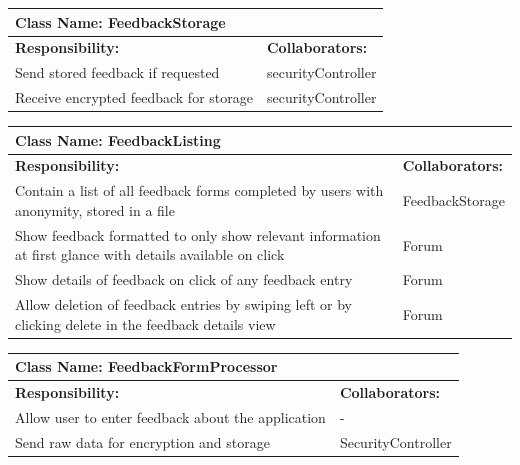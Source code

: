\documentclass[12pt]{article}
\begin{document}
	\begin{table}[ht]
		\centering
		\begin{tabular}{|p{5cm}|p{5cm}|}
		\hline
		 \multicolumn{2}{|l|}{\textbf{Class Name:} FeedbackStorage} \\
		\hline
		\textbf{Responsibility:} & \textbf{Collaborators:} \\
		\hline
		Send stored feedback if requested & securityController\\
		\hline
	    Receive encrypted feedback for storage & securityController\\
		\hline
		\end{tabular}
	\end{table}
	
	\begin{table}[ht]
		\centering
		\begin{tabular}{|p{5cm}|p{5cm}|}
		\hline
		 \multicolumn{2}{|l|}{\textbf{Class Name:} FeedbackListing} \\
		\hline
		\textbf{Responsibility:} & \textbf{Collaborators:} \\
		\hline
		Contain a list of all feedback forms completed by users with anonymity, stored in a file & FeedbackStorage\\
		\hline
	    Show feedback formatted to only show relevant information at first glance with details available on click & Forum\\
		\hline
		Show details of feedback on click of any feedback entry & Forum\\
		\hline
		Allow deletion of feedback entries by swiping left or by clicking delete in the feedback details view & Forum\\
		\hline
		\end{tabular}
	\end{table}

	\begin{table}[ht]
		\centering
		\begin{tabular}{|p{5cm}|p{5cm}|}
		\hline
		 \multicolumn{2}{|l|}{\textbf{Class Name:} FeedbackFormProcessor} \\
		\hline
		\textbf{Responsibility:} & \textbf{Collaborators:} \\
		\hline
	    Allow user to enter feedback about the application & -\\
		\hline
		Send raw data for encryption and storage & SecurityController\\
		\hline
		\end{tabular}
	\end{table}
\end{document}
